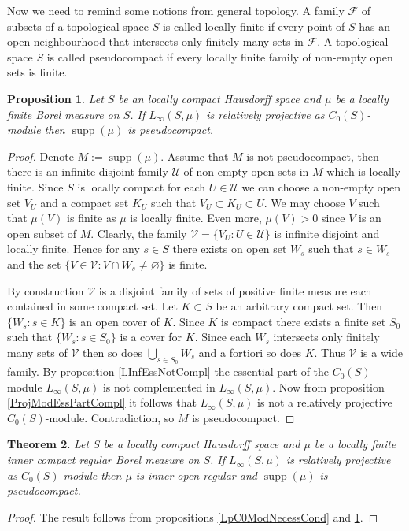 \documentclass[12pt]{article}
\newtheorem{theorem}{Theorem}[section]
\newtheorem{proposition}[theorem]{Proposition}
\begin{document}
Now we need to remind some notions from general topology. A family $\mathcal{F}$ of subsets of a topological space $S$ is called locally finite if every point of $S$ has an open neighbourhood that intersects only finitely many sets in $\mathcal{F}$. A topological space $S$ is called pseudocompact if every locally finite family of non-empty open sets is finite.

\begin{proposition}\label{LInfRelProjSuppCond} Let $S$ be an locally compact Hausdorff space and $\mu$ be a locally finite Borel measure on $S$. If $L_\infty(S,\mu)$ is relatively projective as $C_0(S)$-module then $\operatorname{supp}(\mu)$ is pseudocompact.
\end{proposition}
\begin{proof} Denote $M:=\operatorname{supp}(\mu)$. Assume that $M$ is not pseudocompact, then there is an infinite disjoint family $\mathcal{U}$ of non-empty open sets in $M$ which is locally finite. Since $S$ is locally compact for each $U\in\mathcal{U}$ we can choose a non-empty open set $V_U$ and a compact set $K_U$ such that $V_U\subset K_U\subset  U$. We may choose $V$ such that $\mu(V)$ is finite as $\mu$ is locally finite. Even more, $\mu(V)>0$ since $V$ is an open subset of $M$. Clearly, the family $\mathcal{V}=\{V_U:U\in\mathcal{U}\}$ is infinite disjoint and locally finite. Hence for any $s\in S$ there exists on open set $W_s$ such that $s\in W_s$ and the set $\{V\in\mathcal{V}: V\cap W_s\neq\varnothing\}$ is finite.

    By construction $\mathcal{V}$ is a disjoint family of sets of positive finite measure each contained in some compact set. Let $K\subset S$ be an arbitrary compact set. Then $\{W_s:s\in K\}$ is an open cover of $K$. Since $K$ is compact there exists a finite set $S_0$ such that $\{W_s:s\in S_0\}$ is a cover for $K$. Since each $W_s$ intersects only finitely many sets of $\mathcal{V}$ then so does $\bigcup_{s\in S_0}W_s$ and a fortiori so does $K$. Thus $\mathcal{V}$ is a wide family. By proposition \ref{LInfEssNotCompl} the essential part of the $C_0(S)$-module $L_\infty(S,\mu)$ is not complemented in $L_\infty(S,\mu)$. Now from proposition \ref{ProjModEssPartCompl} it follows that $L_\infty(S,\mu)$ is not a relatively projective $C_0(S)$-module. Contradiction, so $M$ is pseudocompact.
\end{proof}

\begin{theorem}\label{LInfReProjNecessCond} Let $S$ be a locally compact Hausdorff space and $\mu$ be a locally finite inner compact regular Borel measure on $S$. If $L_\infty(S,\mu)$ is relatively projective as $C_0(S)$-module then $\mu$ is inner open regular and $\operatorname{supp}(\mu)$ is pseudocompact.

\end{theorem}
\begin{proof} The result follows from propositions \ref{LpC0ModNecessCond} and \ref{LInfRelProjSuppCond}.
\end{proof}
\end{document}
